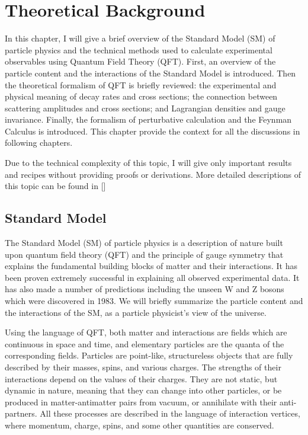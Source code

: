 
\chapter{Theoretical Background}
\label{sec:introduction}
In this chapter, I will give a brief overview of the Standard Model (SM) of particle physics and the technical methods used to calculate experimental observables using Quantum Field Theory (QFT). First, an overview of the particle content and the interactions of the Standard Model is introduced. Then the theoretical formalism of QFT is briefly reviewed: the experimental and physical meaning of decay rates and cross sections; the connection between scattering amplitudes and cross sections; and Lagrangian densities and gauge invariance. Finally, the formalism of perturbative calculation and the Feynman Calculus is introduced. This chapter provide the context for all the discussions in following chapters.

Due to the technical complexity of this topic, I will give only important results and recipes without providing proofs or derivations. More detailed descriptions of this topic can be found in [\cite{Peskin, PDG, Griffith}]


\section{Standard Model}
\label{sec:1.2}
The Standard Model (SM) of particle physics is a description of nature built upon quantum field theory (QFT) and the principle of gauge symmetry that explains the fundamental building blocks of matter and their interactions. It has been proven extremely successful in explaining all observed experimental data. It has also made a number of predictions including the unseen W and Z bosons which were discovered in 1983.  We will briefly summarize the particle content and the interactions of the SM, as a particle physicist's view of the universe.

Using the language of QFT, both matter and interactions are fields which are continuous in space and time, and elementary particles are the quanta of the corresponding fields. Particles are point-like, structureless objects that are fully described by their masses, spins, and various charges. The strengths of their interactions depend on the values of their charges. They are not static, but dynamic in nature, meaning that they can change into other particles, or be produced in matter-antimatter pairs from vacuum, or annihilate with their anti-partners. All these processes are described in the language of interaction vertices, where momentum, charge, spins, and some other quantities are conserved. 


